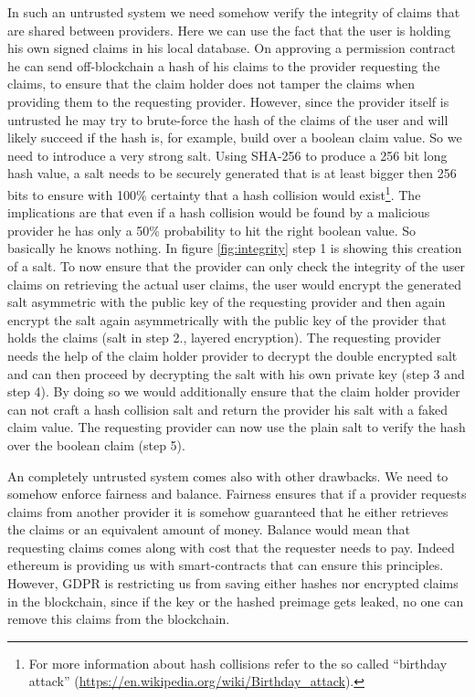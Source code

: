 In such an untrusted system we need somehow verify the integrity of claims that are shared between providers. Here we can use the fact that the user is holding his own signed claims in his local database. On approving a permission contract he can send off-blockchain a hash of his claims to the provider requesting the claims, to ensure that the claim holder does not tamper the claims when providing them to the requesting provider. However, since the provider itself is untrusted he may try to brute-force the hash of the claims of the user and will likely succeed if the hash is, for example, build over a boolean claim value. So we need to introduce a very strong salt. Using SHA-256 to produce a 256 bit long hash value, a salt needs to be securely generated that is at least bigger then 256 bits to ensure with 100\% certainty that a hash collision would exist\footnote{For more information about hash collisions refer to the so called “birthday attack” (\url{https://en.wikipedia.org/wiki/Birthday_attack}).}. The implications are that even if a hash collision would be found by a malicious provider he has only a 50\% probability to hit the right boolean value. So basically he knows nothing. In figure \ref{fig:integrity} step 1 is showing this creation of a salt. To now ensure that the provider can only check the integrity of the user claims on retrieving the actual user claims, the user would encrypt the generated salt asymmetric with the public key of the requesting provider and then again encrypt the salt again asymmetrically with the public key of the provider that holds the claims (salt in step 2., layered encryption). The requesting provider needs the help of the claim holder provider to decrypt the double encrypted salt and can then proceed by decrypting the salt with his own private key (step 3 and step 4). By doing so we would additionally ensure that the claim holder provider can not craft a hash collision salt and return the provider his salt with a faked claim value.  The requesting provider can now use the plain salt to verify the hash over the boolean claim (step 5).

An completely untrusted system comes also with other drawbacks. We need to somehow enforce fairness and balance. Fairness ensures that if a provider requests claims from another provider it is somehow guaranteed that he either retrieves the claims or an equivalent amount of money. Balance would mean that requesting claims comes along with cost that the requester needs to pay. Indeed ethereum is providing us with smart-contracts that can ensure this principles. However, GDPR is restricting us from saving either hashes nor encrypted claims in the blockchain, since if the key or the hashed preimage gets leaked, no one can remove this claims from the blockchain. 

